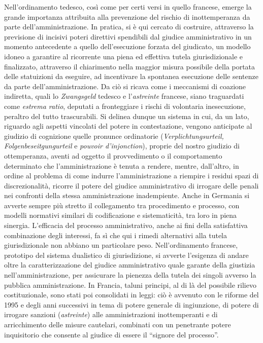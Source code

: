 \documentclass[12pt,it,a4paper,]{report}
\begin{document}
Nell'ordinamento tedesco, così come per certi versi in quello francese,
emerge la grande importanza attribuita alla prevenzione del rischio di
inottemperanza da parte dell'amministrazione. In pratica, si è qui
cercato di costruire, attraverso la previsione di incisivi poteri
direttivi spendibili dal giudice amministrativo in un momento
antecedente a quello dell'esecuzione forzata del giudicato, un modello
idoneo a garantire al ricorrente una piena ed effettiva tutela
giurisdizionale e finalizzato, attraverso il chiarimento nella maggior
misura possibile della portata delle statuizioni da eseguire, ad
incentivare la spontanea esecuzione delle sentenze da parte
dell'amministrazione. Da ciò si ricava come i meccanismi di coazione
indiretta, quali lo \emph{Zwangsgeld} tedesco e l'\emph{astreinte}
francese, siano traguardati come \emph{estrema ratio}, deputati a
fronteggiare i rischi di volontaria inesecuzione, peraltro del tutto
trascurabili. Si delinea dunque un sistema in cui, da un lato, riguardo
agli aspetti vincolati del potere in contestazione, vengono anticipate
al giudizio di cognizione quelle pronunce ordinatorie
(\emph{Verplichtungsurteil, Folgenbeseitgungurteil} e \emph{pouvoir
d'injonction}), proprie del nostro giudizio di ottemperanza, aventi ad
oggetto il provvedimento o il comportamento determinato che
l'amministrazione è tenuta a rendere, mentre, dall'altro, in ordine al
problema di come indurre l'amministrazione a riempire i residui spazi di
discrezionalità, ricorre il potere del giudice amministrativo di
irrogare delle penali nei confronti della stessa amministrazione
inadempiente. Anche in Germania si avverte sempre più stretto il
collegamento tra procedimento e processo, con modelli normativi similari
di codificazione e sistematicità, tra loro in piena sinergia.
L'efficacia del processo amministrativo, anche ai fini della
satisfattiva combinazione degli interessi, fa sì che qui i rimedi
alternativi alla tutela giurisdizionale non abbiano un particolare peso.
Nell'ordinamento francese, prototipo del sistema dualistico di
giurisdizione, si avverte l'esigenza di andare oltre la
caratterizzazione del giudice amministrativo quale garante della
giustizia nell'amministrazione, per assicurare la pienezza della tutela
dei singoli avverso la pubblica amministrazione. In Francia, taluni
principi, al di là del possibile rilievo costituzionale, sono stati poi
consolidati in leggi: ciò è avvenuto con le riforme del 1995 e degli
anni successivi in tema di potere generale di ingiunzione, di potere di
irrogare sanzioni (\emph{astreinte}) alle amministrazioni inottemperanti
e di arricchimento delle misure cautelari, combinati con un penetrante
potere inquisitorio che consente al giudice di essere il ``signore del
processo''.
\end{document}
